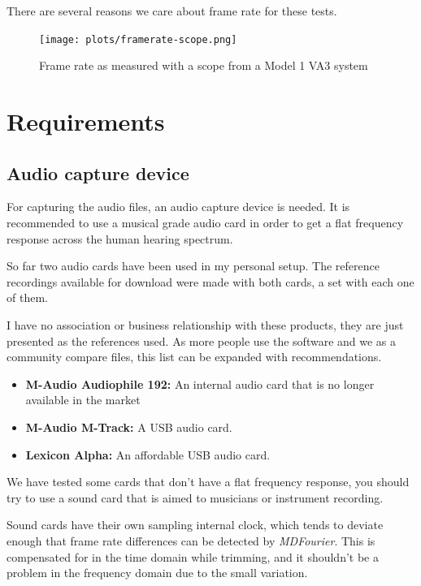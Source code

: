 \documentclass[10pt,a4paper]{report}
\begin{document}
\begin{appendices}
There are several reasons we care about frame rate for these tests.

\begin{figure}[H]
	\centering
	\texttt{[image: plots/framerate-scope.png]}
	\caption[Scope frame rate]{Frame rate as measured with a scope from a Model 1 VA3 system}
	\label{fig:frameratescope}
\end{figure}



\chapter{Requirements}
\label{requirements}
\section{Audio capture device}
\label{audiocards}
For capturing the audio files, an audio capture device is needed. It is recommended to use a musical grade audio card in order to get a flat frequency response across the human hearing spectrum.

So far two audio cards have been used in my personal setup. The reference recordings available for download were made with both cards, a set with each one of them.

I have no association or business relationship with these products, they are just presented as the references used. As more people use the software and we as a community compare files, this list can be expanded with recommendations.

\begin{itemize}
	\item \textbf{M-Audio Audiophile 192:} An internal audio card that is no longer available in the market \cite{maudio}
	\item \textbf{M-Audio M-Track:} A USB audio card. \cite{maudiomtrack}
	\item \textbf{Lexicon Alpha:} An affordable USB audio card. \cite{lexicon}
\end{itemize}

We have tested some cards that don't have a flat frequency response, you should try to use a sound card that is aimed to musicians or instrument recording.

Sound cards have their own sampling internal clock, which tends to deviate enough that frame rate differences can be detected by \textit{MDFourier}. This is compensated for in the time domain while trimming, and it shouldn't be a problem in the frequency domain due to the small variation. \cite{SoundCardClock}


\end{appendices}
\end{document}

